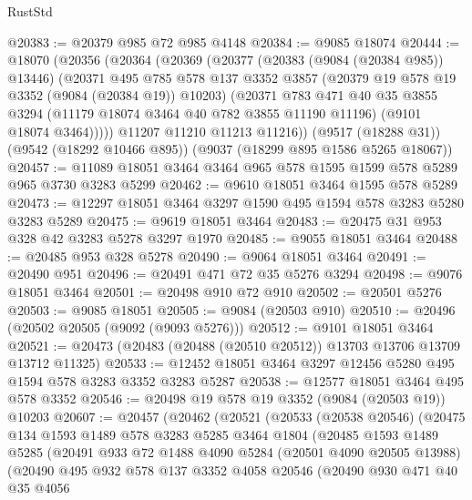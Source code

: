 \begin{lexlean}{RustStd}
\begin{coremodule}
@20383 := @20379 @985 @72 @985 @4148
@20384 := @9085 @18074
@20444 := @18070
    (@20356
      (@20364
        (@20369
          (@20377
            (@20383 (@9084 (@20384 @985)) @13446)
            (@20371
              @495
              @785
              @578
              @137
              @3352
              @3857
              (@20379 @19 @578 @19 @3352 (@9084 (@20384 @19)) @10203)
              (@20371
                @783
                @471
                @40
                @35
                @3855
                @3294
                (@11179 @18074 @3464 @40 @782 @3855 @11190 @11196)
                (@9101 @18074 @3464)))))
        @11207
        @11210
        @11213
        @11216))
    (@9517 (@18288 @31))
    (@9542 (@18292 @10466 @895))
    (@9037 (@18299 @895 @1586 @5265 @18067))
@20457 := @11089 @18051 @3464 @3464 @965 @578 @1595 @1599 @578 @5289 @965 @3730 @3283 @5299
@20462 := @9610 @18051 @3464 @1595 @578 @5289
@20473 := @12297 @18051 @3464 @3297 @1590 @495 @1594 @578 @3283 @5280 @3283 @5289
@20475 := @9619 @18051 @3464
@20483 := @20475 @31 @953 @328 @42 @3283 @5278 @3297 @1970
@20485 := @9055 @18051 @3464
@20488 := @20485 @953 @328 @5278
@20490 := @9064 @18051 @3464
@20491 := @20490 @951
@20496 := @20491 @471 @72 @35 @5276 @3294
@20498 := @9076 @18051 @3464
@20501 := @20498 @910 @72 @910
@20502 := @20501 @5276
@20503 := @9085 @18051
@20505 := @9084 (@20503 @910)
@20510 := @20496 (@20502 @20505 (@9092 (@9093 @5276)))
@20512 := @9101 @18051 @3464
@20521 := @20473 (@20483 (@20488 (@20510 @20512)) @13703 @13706 @13709 @13712 @11325)
@20533 := @12452 @18051 @3464 @3297 @12456 @5280 @495 @1594 @578 @3283 @3352 @3283 @5287
@20538 := @12577 @18051 @3464 @495 @578 @3352
@20546 := @20498 @19 @578 @19 @3352 (@9084 (@20503 @19)) @10203
@20607 := @20457
    (@20462
      (@20521
        (@20533
          (@20538 @20546)
          (@20475
            @134
            @1593
            @1489
            @578
            @3283
            @5285
            @3464
            @1804
            (@20485
              @1593
              @1489
              @5285
              (@20491
                @933
                @72
                @1488
                @4090
                @5284
                (@20501 @4090 @20505 @13988)
                (@20490
                  @495
                  @932
                  @578
                  @137
                  @3352
                  @4058
                  @20546
                  (@20490
                    @930
                    @471
                    @40
                    @35
                    @4056

\end{coremodule}
\end{lexlean}
